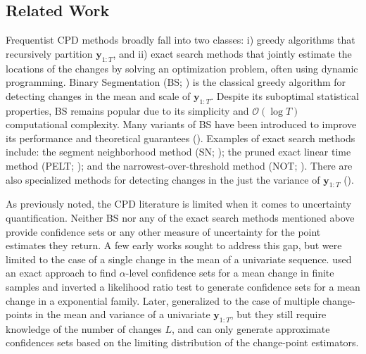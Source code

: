 \subsection{Related Work}
Frequentist CPD methods broadly fall into two classes: i) greedy algorithms that recursively partition $\mathbf{y}_{1:T}$, and ii) exact search methods that jointly estimate the locations of the changes by solving an optimization problem, often using dynamic programming. Binary Segmentation (BS; \citealp{Scott74, Sen75, Vostrikova81}) is the classical greedy algorithm for detecting changes in the mean and scale of $\mathbf{y}_{1:T}$. Despite its suboptimal statistical properties, BS remains popular due to its simplicity and $\mathcal{O}(\log T)$ computational complexity. Many variants of BS have been introduced to improve its performance and theoretical guarantees (\citealp{Olshen04, Fryzlewicz14, Kovacs22}). Examples of exact search methods include: the segment neighborhood method (SN; \citealp{Auger89}); the pruned exact linear time method (PELT; \citealp{Killick12}); and the narrowest-over-threshold method (NOT; \citealp{Baranowski19}). There are also specialized methods for detecting changes in the just the variance of $\mathbf{y}_{1:T}$ (\citealp{Inclan94, Chen97, Gao19, Padilla22}). 



As previously noted, the CPD literature is limited when it comes to uncertainty quantification. Neither BS nor any of the exact search methods mentioned above provide confidence sets or any other measure of uncertainty for the point estimates they return. A few early works sought to address this gap, but were limited to the case of a single change in the mean of a univariate sequence. \cite{Siegmund86} used an exact approach to find $\alpha$-level confidence sets for a mean change in finite samples and \cite{Worsley86} inverted a likelihood ratio test to generate confidence sets for a mean change in a exponential family. Later, \citealp{Bai03} generalized to the case of multiple change-points in the mean and variance of a univariate $\mathbf{y}_{1:T}$, but they still require knowledge of the number of changes $L$, and can only generate approximate confidences sets based on the limiting distribution of the change-point estimators. 

